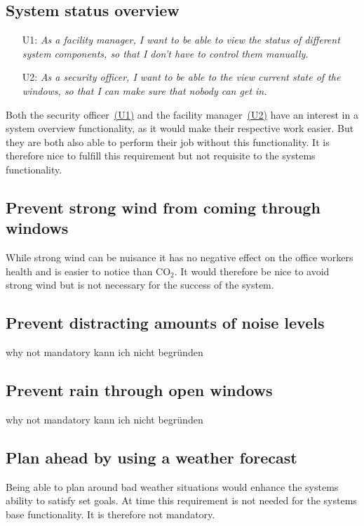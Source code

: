 \documentclass[runningheads]{llncs}
\begin{document}
\subsection{System status overview}
\begin{itemize}
    \item [U1:] \label{r6u1} \textit{As a facility manager, I want to be able to view the status of different system components, so that I don't have to control them manually.}
    \item [U2:] \label{r6u2} \textit{As a security officer, I want to be able to the view current state of the windows, so that I can make sure that nobody can get in.}
\end{itemize}
Both the security officer~\hyperref[r6u1]{(U1)} and the facility manager~\hyperref[r6u1]{(U2)} have an interest in a system overview functionality, as it would make their respective work easier. But they are both also able to perform their job without this functionality. It is therefore nice to fulfill this requirement but not requisite to the systems functionality.

\subsection{Prevent strong wind from coming through windows}
While strong wind can be nuisance it has no negative effect on the office workers health and is easier to notice than CO$_2$. It would therefore be nice to avoid strong wind but is not necessary for the success of the system. 

\subsection{Prevent distracting amounts of noise levels}
why not mandatory kann ich nicht begründen

\subsection{Prevent rain through open windows}
why not mandatory kann ich nicht begründen

\subsection{Plan ahead by using a weather forecast}
Being able to plan around bad weather situations would enhance the systems ability to satisfy set goals. At time this requirement is not needed for the systems base functionality. It is therefore not mandatory.   
\end{document}
